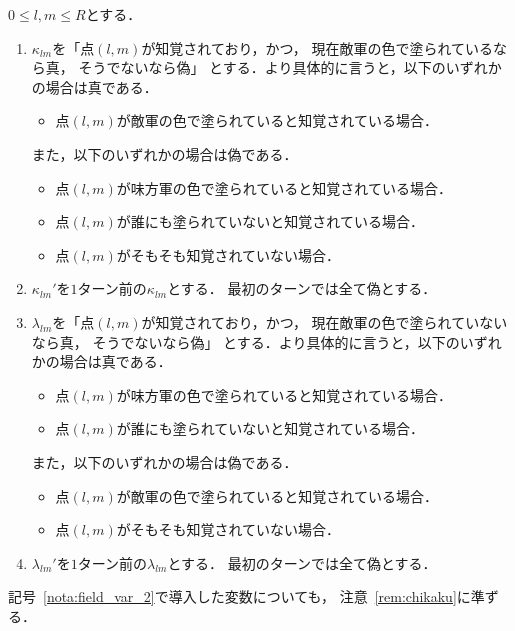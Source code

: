 \begin{nota}[隠伏・顕現のための床からの制約変数] \label{nota:field_var_2}
 $0 \leq l, m \leq R$とする．
 \begin{enumerate}[1.]
  \item $\kappa_{lm}$を「点$(l, m)$が知覚されており，かつ，
        現在敵軍の色で塗られているなら真，
        そうでないなら偽」
        とする．より具体的に言うと，以下のいずれかの場合は真である．
        \begin{itemize}
         \item 点$(l, m)$が敵軍の色で塗られていると知覚されている場合．
        \end{itemize}
        また，以下のいずれかの場合は偽である．
        \begin{itemize}
         \item 点$(l, m)$が味方軍の色で塗られていると知覚されている場合．
         \item 点$(l, m)$が誰にも塗られていないと知覚されている場合．
         \item 点$(l, m)$がそもそも知覚されていない場合．
        \end{itemize}
  \item $\kappa_{lm}'$を$1$ターン前の$\kappa_{lm}$とする．
        最初のターンでは全て偽とする．
  \item $\lambda_{lm}$を「点$(l, m)$が知覚されており，かつ，
        現在敵軍の色で塗られていないなら真，
        そうでないなら偽」
        とする．より具体的に言うと，以下のいずれかの場合は真である．
        \begin{itemize}
         \item 点$(l, m)$が味方軍の色で塗られていると知覚されている場合．
         \item 点$(l, m)$が誰にも塗られていないと知覚されている場合．
        \end{itemize}
        また，以下のいずれかの場合は偽である．
        \begin{itemize}
         \item 点$(l, m)$が敵軍の色で塗られていると知覚されている場合．
         \item 点$(l, m)$がそもそも知覚されていない場合．
        \end{itemize}
  \item $\lambda_{lm}'$を$1$ターン前の$\lambda_{lm}$とする．
        最初のターンでは全て偽とする．
 \end{enumerate}
\end{nota}

記号~\ref{nota:field_var_2}で導入した変数についても，
注意~\ref{rem:chikaku}に準ずる．

